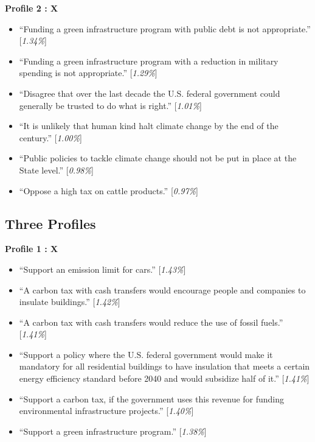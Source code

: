 \documentclass{article}
\begin{document}
\textbf{Profile 2 : X}
\begin{itemize}
   \item ``Funding a green infrastructure program with public debt is not appropriate.'' [\textit{1.34\%}]
   \item ``Funding a green infrastructure program with a reduction in military spending is not appropriate.'' [\textit{1.29\%}]
   \item ``Disagree that over the last decade the U.S. federal government could generally be trusted to do what is right.'' [\textit{1.01\%}]
   \item ``It is unlikely that human kind halt climate change by the end of the century.'' [\textit{1.00\%}]
   \item ``Public policies to tackle climate change should not be put in place at the State level.'' [\textit{0.98\%}]
   \item ``Oppose a high tax on cattle products.'' [\textit{0.97\%}]
\end{itemize}



\subsection{Three Profiles}

\textbf{Profile 1 : X}

\begin{itemize}
    \item ``Support an emission limit for cars.'' [\textit{1.43\%}] 
    \item ``A carbon tax with cash transfers would encourage people and companies to insulate buildings.'' [\textit{1.42\%}]
    \item ``A carbon tax with cash transfers would reduce the use of fossil fuels.'' [\textit{1.41\%}]
    \item ``Support a policy where the U.S. federal government would make it mandatory for all residential buildings to have insulation that meets a certain energy efficiency standard before 2040 and would subsidize half of it.'' [\textit{1.41\%}]
    \item ``Support a carbon tax, if the government uses this revenue for funding environmental infrastructure projects.'' [\textit{1.40\%}]
    \item ``Support a green infrastructure program.'' [\textit{1.38\%}]
\end{itemize}
\end{document}
